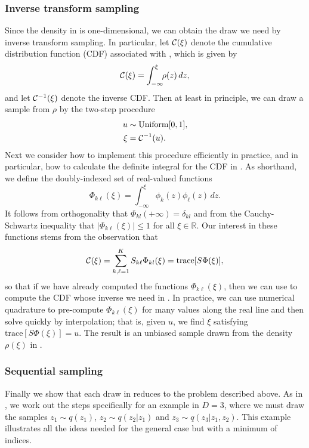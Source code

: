 \subsubsection*{Inverse transform sampling}
Since the density in
is one-dimensional, we can obtain the draw we need by inverse transform sampling.
In particular, let $\mathcal{C}(\xi)$ denote the cumulative distribution function (CDF)
associated with , which is given by
\begin{equation}
\mathcal{C}(\xi) = \int_{-\infty}^\xi\!\! \rho(z)\,dz,
\label{eq:CDF}
\end{equation}
and let $\mathcal{C}^{-1}(\xi)$ denote the inverse CDF.
Then at least in principle, we can draw a sample from $\rho$ by the two-step procedure
\begin{align}
    u & \sim \text{Uniform}[0,1], \\
    \xi & = \mathcal{C}^{-1}(u). \label{eq:invCDF}
\end{align}
Next we consider how to implement this procedure efficiently in practice,
and in particular, how to calculate the definite integral for the CDF in .
As shorthand, we define the doubly-indexed set of real-valued functions
\begin{equation}
    \Phi_{k\ell}(\xi) = \int_{-\infty}^\xi \phi_k(z)\phi_\ell(z)\, dz.
\end{equation}
It follows from orthogonality that $\Phi_{kl}(+\infty) = \delta_{kl}$ and from the Cauchy-Schwartz inequality that $|\Phi_{k\ell}(\xi)|\leq 1$ for all $\xi\in\mathbb{R}$. Our interest in these functions stems from the observation that
\begin{equation}
\mathcal{C}(\xi) = \sum_{k,\ell=1}^K S_{k\ell} \Phi_{kl}(\xi) = \text{trace}[S\Phi(\xi)],
\label{eq:CDF-trace}
\end{equation}
so that if we have already computed the functions $\Phi_{k\ell}(\xi)$,
then we can use  to compute the CDF whose inverse we need in
.
In practice, we can use numerical quadrature to pre-compute $\Phi_{k\ell}(\xi)$
for many values along the real line and then solve  quickly by interpolation;
that is, given $u$, we find $\xi$ satisfying $\text{trace}[S\Phi(\xi)]=u$.
The result is an unbiased sample drawn from the density $\rho(\xi)$ in .

\subsubsection*{Sequential sampling}
Finally we show that each draw in
reduces to the problem described above.
As in , we work out the steps specifically for an example in $D\!=\!3$,
where we must draw the samples $z_1\sim q(z_1)$, $z_2\sim q(z_2|z_1)$ and
$z_3\sim q(z_3|z_1,z_2)$.
This example illustrates all the ideas needed for the general case but with a
minimum of indices.

